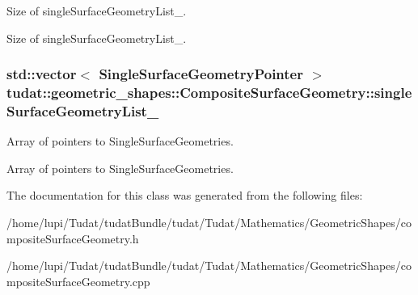 Size of single\+Surface\+Geometry\+List\+\_\+. 

Size of single\+Surface\+Geometry\+List\+\_\+. 
\subsubsection[{\texorpdfstring{single\+Surface\+Geometry\+List\+\_\+}{singleSurfaceGeometryList_}}]{\setlength{\rightskip}{0pt plus 5cm}std\+::vector$<$ Single\+Surface\+Geometry\+Pointer $>$ tudat\+::geometric\+\_\+shapes\+::\+Composite\+Surface\+Geometry\+::single\+Surface\+Geometry\+List\+\_\+\hspace{0.3cm}{\ttfamily [protected]}}\hypertarget{classtudat_1_1geometric__shapes_1_1CompositeSurfaceGeometry_a98349fc2023b545d49ae7f8d51967a78}{}\label{classtudat_1_1geometric__shapes_1_1CompositeSurfaceGeometry_a98349fc2023b545d49ae7f8d51967a78}


Array of pointers to Single\+Surface\+Geometries. 

Array of pointers to Single\+Surface\+Geometries. 

The documentation for this class was generated from the following files\+:\begin{DoxyCompactItemize}
\item 
/home/lupi/\+Tudat/tudat\+Bundle/tudat/\+Tudat/\+Mathematics/\+Geometric\+Shapes/composite\+Surface\+Geometry.\+h\item 
/home/lupi/\+Tudat/tudat\+Bundle/tudat/\+Tudat/\+Mathematics/\+Geometric\+Shapes/composite\+Surface\+Geometry.\+cpp\end{DoxyCompactItemize}
